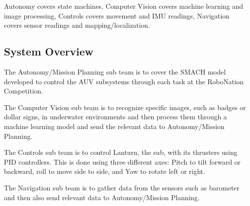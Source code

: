 Autonomy covers state machines, Computer Vision covers machine learning and
image processing, Controls covers movement and IMU readings, Navigation covers
sensor readings and mapping/localization.
\par

\subsection{System Overview}
\label{sec:overview}
The Autonomy/Mission Planning sub team is to cover the SMACH model developed to
control the AUV subsystems through each task at the RoboNation Competition.  
\par

The Computer Vision sub team is to recognize specific images, such as badges or
dollar signs, in underwater environments and then process them through a
machine learning model and send the relevant data to Autonomy/Mission Planning. 
\par

The Controls sub team is to control Lanturn, the sub, with its thrusters using
PID controllers. This is done using three different axes: Pitch to tilt forward
or backward, roll to move side to side, and Yaw to rotate left or right.  
\par

The Navigation sub team is to gather data from the sensors such as barometer
and then also send relevant data to Autonomy/Mission Planning. 
\par
 
